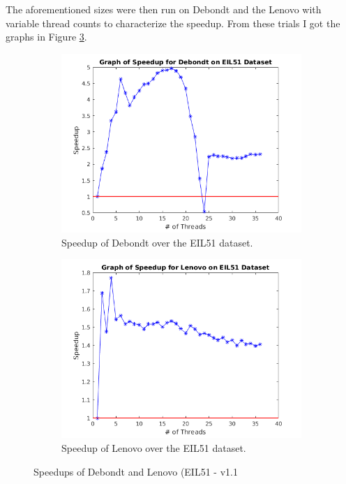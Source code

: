 \documentclass[10pt,letterpaper]{article}
\begin{document}
The aforementioned sizes were then run on Debondt and the Lenovo with variable thread counts to characterize the speedup. From these trials I got the graphs in Figure \ref{fig:EILspeedups}.


\begin{figure}[t]
\centering
  \begin{subfigure}{0.49\linewidth} \centering
	\includegraphics[width=\textwidth]{../img/Debondt_speedup.png}
    \caption{Speedup of Debondt over the EIL51 dataset.}\label{fig:figA}
  \end{subfigure}
  \begin{subfigure}{0.49\linewidth} \centering
	\includegraphics[width=\textwidth]{../img/Lenovo_Speedup.png}
    \caption{Speedup of Lenovo over the EIL51 dataset.}\label{fig:figB}
  \end{subfigure}
\caption{Speedups of Debondt and Lenovo (EIL51 - v1.1} \label{fig:EILspeedups}
\end{figure}
\end{document}

